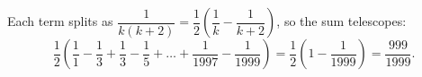 Each term splits as $\dfrac{1}{k(k+2)}=\dfrac{1}{2}\left(\dfrac{1}{k}-\dfrac{1}{k+2}\right)$, so the sum telescopes:
\[
\dfrac{1}{2}\left(\dfrac{1}{1}-\dfrac{1}{3}+\dfrac{1}{3}-\dfrac{1}{5}+\dots+\dfrac{1}{1997}-\dfrac{1}{1999}\right)=\dfrac{1}{2}\left(1-\dfrac{1}{1999}\right)=\boxed{\dfrac{999}{1999}}.
\]
